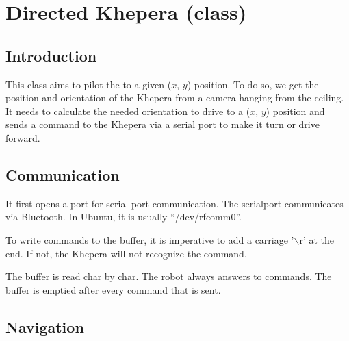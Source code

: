 \section{Directed Khepera (class)}
\label{sec:dk}

\subsection{Introduction}
\label{sec:dk:intro}

This class aims to pilot the \khepera to a given ($x$, $y$) position. To do 
so, we get the position and orientation of the Khepera from a camera 
hanging from the ceiling. It needs to calculate the needed orientation 
to drive to a ($x$, $y$) position and sends a command to the Khepera via a 
serial port to make it turn or drive forward.

\subsection{Communication}
\label{sec:dk:comm}

It first opens a port for serial port communication. The serialport 
communicates via Bluetooth. In Ubuntu, it is usually “/dev/rfcomm0”.

To write commands to the buffer, it is imperative to add a carriage '$\backslash$r' 
at the end. If not, the Khepera will not recognize the command. 

The buffer is read char by char. The robot always answers to commands. 
The buffer is emptied after every command that is sent.

\subsection{Navigation}
\label{sec:dk:nav}

 
